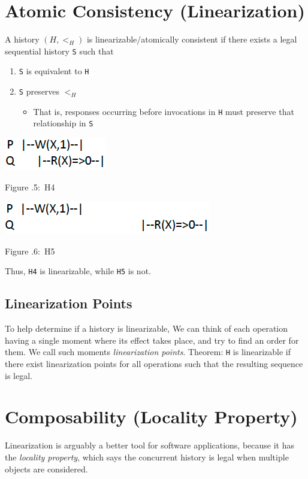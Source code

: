 \documentclass[twoside]{article}
\newcounter{lecnum}
\newcommand{\fig}[3]{
			\vspace{#2}
			\begin{center}
			Figure \thelecnum.#1:~#3
			\end{center}
	}
\begin{document}
\section{Atomic Consistency (Linearization)}

A history $(H, <_H)$ is linearizable/atomically consistent if there exists a legal sequential history {\tt S} such that
\begin{enumerate}
\item {\tt S} is equivalent to {\tt H}
\item {\tt S} preserves $<_H$
\begin{itemize}
\item That is, responses occurring before invocations in {\tt H} must preserve that relationship in {\tt S}
\end{itemize}
\end{enumerate}

\includegraphics{H4}
\fig{5}{2px}{H4}

\includegraphics{H5}
\fig{6}{2px}{H5}

Thus, {\tt H4} is linearizable, while {\tt H5} is not.

\subsection{Linearization Points}

To help determine if a history is linearizable, We can think of each operation having a single moment where its effect takes place, and try to find an order for them. We call such moments {\em linearization points}.
Theorem: {\tt H} is linearizable if there exist linearization points for all operations such that the resulting sequence is legal.

\section{Composability (Locality Property)}

Linearization is arguably a better tool for software applications, because it has the {\em locality property}, which says the concurrent history is legal when multiple objects are considered.
\end{document}
